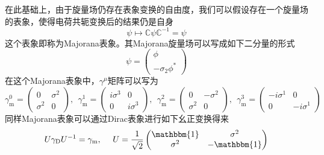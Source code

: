 在此基础上，由于旋量场仍存在表象变换的自由度，我们可以假设存在一个旋量场的表象，使得电荷共轭变换后的结果仍是自身
\begin{equation}
    \psi\mapsto\mathbb{C}\psi\mathbb{C}^{-1} = \psi
\end{equation}
这个表象即称为Majorana表象。其Majorana旋量场可以写成如下二分量的形式
\begin{equation}
    \psi = \begin{pmatrix}
        \phi\\-\sigma_2 \phi^*
    \end{pmatrix}
\end{equation}
在这个Majorana表象中，$\gamma^\mu$矩阵可以写为
\begin{equation}
    \gamma^0_\mathrm{m} = \begin{pmatrix}
        0&\sigma^2\\\sigma^2&0
    \end{pmatrix},~~\gamma^1_\mathrm{m} = \begin{pmatrix}
        i\sigma^3&0\\0&i\sigma^3
    \end{pmatrix},~~\gamma^2_\mathrm{m} = \begin{pmatrix}
        0&-\sigma^2\\\sigma^2&0
    \end{pmatrix},~~\gamma^3_\mathrm{m} = \begin{pmatrix}
        -i\sigma^1&0\\0&-i\sigma^1
    \end{pmatrix}
\end{equation}
同样Majorana表象可以通过Dirac表象进行如下幺正变换得来
\begin{equation}
    U\gamma_\mathrm{D} U^{-1}=\gamma_\mathrm{m}, ~~~~U=\frac{1}{\sqrt{2}}\begin{pmatrix}
        \mathbbm{1}&    \sigma^2\\  \sigma^2&   -\mathbbm{1}
    \end{pmatrix}
\end{equation}

